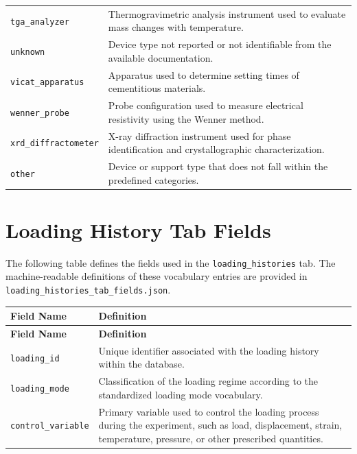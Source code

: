 \documentclass[11pt]{book}
\begin{document}
{\begin{longtable}{p{}p{}}
\texttt{tga\_analyzer} &
Thermogravimetric analysis instrument used to evaluate mass changes with temperature. \\

\texttt{unknown} &
Device type not reported or not identifiable from the available documentation. \\

\texttt{vicat\_apparatus} &
Apparatus used to determine setting times of cementitious materials. \\

\texttt{wenner\_probe} &
Probe configuration used to measure electrical resistivity using the Wenner method. \\

\texttt{xrd\_diffractometer} &
X-ray diffraction instrument used for phase identification and crystallographic characterization. \\

\texttt{other} &
Device or support type that does not fall within the predefined categories. \\

\hline
\end{longtable}


\section{Loading History Tab Fields}
\label{vocab:loading_history_fields_tab}

The following table defines the fields used in the \texttt{loading\_histories} tab. The machine-readable definitions of these vocabulary entries are provided in \texttt{loading\_histories\_tab\_fields.json}.

\begin{longtable}{p{}p{}}
\hline
\textbf{Field Name} & \textbf{Definition} \\
\hline
\endfirsthead

\hline
\textbf{Field Name} & \textbf{Definition} \\
\hline
\endhead

\texttt{loading\_id} &
Unique identifier associated with the loading history within the database. \\

\texttt{loading\_mode} &
Classification of the loading regime according to the standardized loading mode vocabulary. \\

\texttt{control\_variable} &
Primary variable used to control the loading process during the experiment, such as load, displacement, strain, temperature, pressure, or other prescribed quantities. \\


\end{longtable}}
\end{document}
